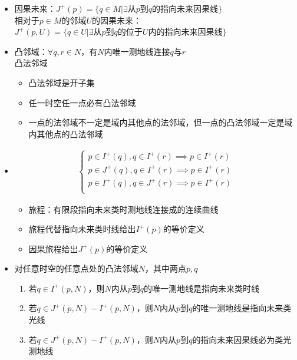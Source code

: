 \begin{itemize}
    \begin{itemize}
        \item $I^+(p)=I^+(p, M)$
        \item $\exists U, I^+(p, U) \neq I^+(p) \cap U$
    \end{itemize}
    \item 因果未来：$J^+(p)=\{q \in M | \exists \text{从} p \text{到} q \text{的指向未来因果线}\}$\\
    相对于$p \in M$的邻域$U$的因果未来：$J^+(p, U)=\{q \in U | \exists \text{从} p \text{到} q \text{的位于$U$内的指向未来因果线}\}$
    \item 凸邻域：$\forall q, r \in N$，有$N$内唯一测地线连接$q$与$r$\\
    凸法邻域
    \begin{itemize}
        \item 凸法邻域是开子集
        \item 任一时空任一点必有凸法邻域
        \item 一点的法邻域不一定是域内其他点的法邻域，但一点的凸法邻域一定是域内其他点的凸法邻域
    \end{itemize}
    \item \begin{gather*}
        \begin{cases}
            p \in I^+(q),q \in I^+(r) \implies p \in I^+(r)\\
            p \in J^+(q),q \in I^+(r) \implies p \in I^+(r)\\
            p \in I^+(q),q \in J^+(r) \implies p \in I^+(r)\\
        \end{cases}
    \end{gather*}
    \begin{itemize}
        \item 旅程：有限段指向未来类时测地线连接成的连续曲线
        \item 旅程代替指向未来类时线给出$I^+(p)$的等价定义
        \item 因果旅程给出$J^+(p)$的等价定义
    \end{itemize}
    \item 对任意时空的任意点处的凸法邻域$N$，其中两点$p, q$
    \begin{enumerate}
        \item 若$q \in I^+(p, N)$，则$N$内从$p$到$q$的唯一测地线是指向未来类时线
        \item 若$q \in J^+(p, N) - I^+(p, N)$，则$N$内从$p$到$q$的唯一测地线是指向未来类光线
        \item 若$q \in J^+(p, N) - I^+(p, N)$，则$N$内从$p$到$q$的指向未来因果线必为类光测地线

\end{enumerate}
\end{itemize}
